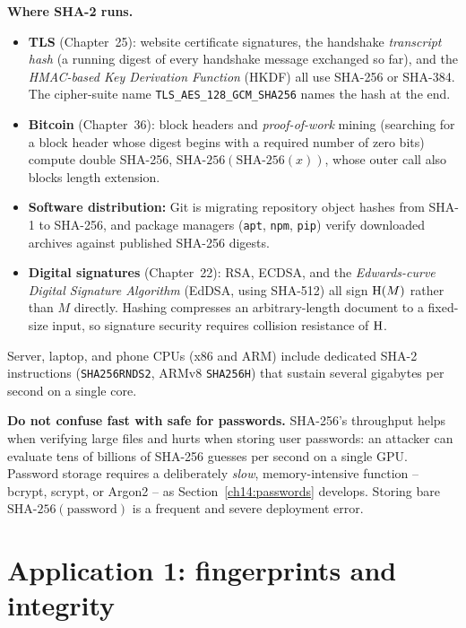 \begin{applicationbox}
\textbf{Where SHA-2 runs.}
\begin{itemize}
  \item \textbf{TLS} (Chapter~25): website certificate signatures, the handshake \emph{transcript hash} (a running digest of every handshake message exchanged so far), and the \emph{HMAC-based Key Derivation Function} (HKDF) all use SHA-256 or SHA-384. The cipher-suite name \texttt{TLS\_AES\_128\_GCM\_SHA256} names the hash at the end.
  \item \textbf{Bitcoin} (Chapter~36): block headers and \emph{proof-of-work} mining (searching for a block header whose digest begins with a required number of zero bits) compute double SHA-256, $\text{SHA-256}(\text{SHA-256}(x))$, whose outer call also blocks length extension.
  \item \textbf{Software distribution:} Git is migrating repository object hashes from SHA-1 to SHA-256, and package managers (\texttt{apt}, \texttt{npm}, \texttt{pip}) verify downloaded archives against published SHA-256 digests.
  \item \textbf{Digital signatures} (Chapter~22): RSA, ECDSA, and the \emph{Edwards-curve Digital Signature Algorithm} (EdDSA, using SHA-512) all sign $\operatorname{H}(M)$ rather than $M$ directly. Hashing compresses an arbitrary-length document to a fixed-size input, so signature security requires collision resistance of $\operatorname{H}$.
\end{itemize}
Server, laptop, and phone CPUs (x86 and ARM) include dedicated SHA-2 instructions (\texttt{SHA256RNDS2}, ARMv8 \texttt{SHA256H}) that sustain several gigabytes per second on a single core.
\end{applicationbox}

\begin{trapbox}
\textbf{Do not confuse fast with safe for passwords.} SHA-256's throughput helps when verifying large files and hurts when storing user passwords: an attacker can evaluate tens of billions of SHA-256 guesses per second on a single GPU. Password storage requires a deliberately \emph{slow}, memory-intensive function -- bcrypt, scrypt, or Argon2 -- as Section~\ref{ch14:passwords} develops. Storing bare $\text{SHA-256}(\text{password})$ is a frequent and severe deployment error.
\end{trapbox}

\section{Application 1: fingerprints and integrity}
\label{ch14:fingerprints}

